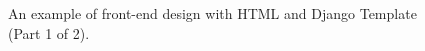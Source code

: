 \begin{figure}[H]
	\centering
	\caption{An example of front-end design with HTML and Django Template (Part 1 of 2).}
	\label{fig:dvt1}
\end{figure}
